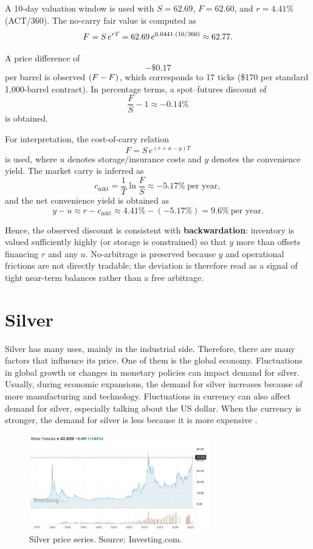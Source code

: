 \documentclass[10pt,a4paper]{article} %
\begin{document}
A 10-day valuation window is used with $S=62.69$, $F=62.60$, and $r=4.41\%$ (ACT/360). The no-carry fair value is computed as
\[
F^{\*}=S\,e^{rT}=62.69\,e^{0.0441\cdot(10/360)}\approx62.77.
\]

A price difference of
\[
-\$0.17
\]
per barrel is observed $(F-F^{\*})$, which corresponds to 17 ticks (\$170 per standard 1,000-barrel contract). In percentage terms, a spot–futures discount of
\[
\frac{F}{S}-1 \approx -0.14\%
\]
is obtained.

For interpretation, the cost-of-carry relation
\[
F=S\,e^{(r+u-y)T}
\]
is used, where $u$ denotes storage/insurance costs and $y$ denotes the convenience yield. The market carry is inferred as
\[
c_{\text{mkt}}=\frac{1}{T}\ln\!\frac{F}{S}\approx-5.17\%\ \text{per year},
\]
and the net convenience yield is obtained as
\[
y-u \approx r-c_{\text{mkt}}\approx 4.41\%-(-5.17\%)=9.6\% \ \text{per year}.
\]

Hence, the observed discount is consistent with \textbf{backwardation}: inventory is valued sufficiently highly (or storage is constrained) so that $y$ more than offsets financing $r$ and any $u$. No-arbitrage is preserved because $y$ and operational frictions are not directly tradable; the deviation is therefore read as a signal of tight near-term balances rather than a free arbitrage.



\section{Silver}
Silver has many uses, mainly in the industrial side. Therefore, there are many factors that influence its price. One of them is the global economy. Fluctuations in global growth or changes in monetary policies can impact demand for silver. Usually, during economic expansions, the demand for silver increases because of more manufacturing and technology. Fluctuations in currency can also affect demand for silver, especially talking about the US dollar. When the currency is stronger, the demand for silver is less because it is more expensive \citep{silver_institute_wss_2024,usgs_silver_mcs_2024,bis_usd_commodity_2023}.

\begin{figure}[h]
\centering
\includegraphics[width=0.7\textwidth]{figures/silver.jpg}
\caption{Silver price series. Source: Investing.com.}
\end{figure}
\end{document}
